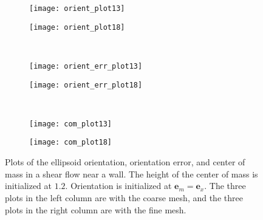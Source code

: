 \documentclass{article}
\newcommand{\vect}[1]{\boldsymbol{\mathbf{#1}}}
\begin{document}
\begin{figure}
  \centering
  \begin{subfigure}{0.49\textwidth}
    \texttt{[image: orient\_plot13]}
  \end{subfigure}
  \hfill
  \begin{subfigure}{0.49\textwidth}
    \texttt{[image: orient\_plot18]}
  \end{subfigure}
  \\
  \begin{subfigure}{0.49\textwidth}
    \texttt{[image: orient\_err\_plot13]}
  \end{subfigure}
  \hfill
  \begin{subfigure}{0.49\textwidth}
    \texttt{[image: orient\_err\_plot18]}
  \end{subfigure}
  \\
  \begin{subfigure}{0.49\textwidth}
    \texttt{[image: com\_plot13]}
  \end{subfigure}
  \hfill
  \begin{subfigure}{0.49\textwidth}
    \texttt{[image: com\_plot18]}
  \end{subfigure}
  \caption{Plots of the ellipsoid orientation, orientation error, and
    center of mass in a shear flow near a wall. The height of the
    center of mass is initialized at $1.2$. Orientation is initialized
    at $\vect{e}_m = \vect{e}_x$. The three plots in the left column
    are with the coarse mesh, and the three plots in the right column
    are with the fine mesh.}
  \label{fig:second-wall-test}
\end{figure}
\end{document}
